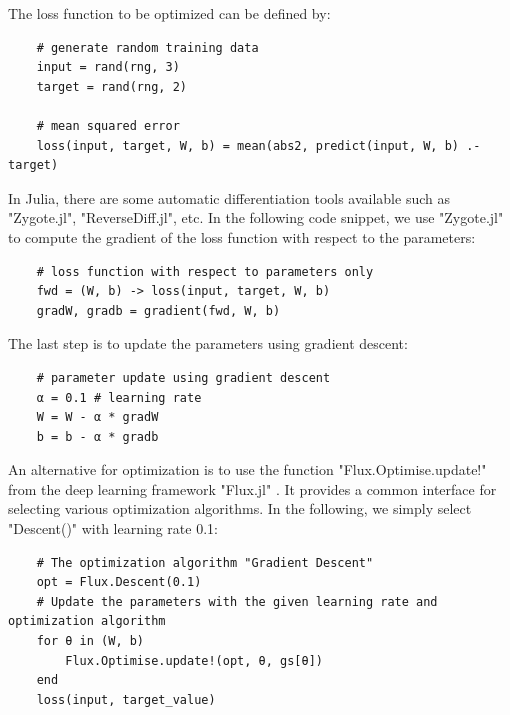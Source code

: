 \documentclass[
	parskip, 			   %
	twoside, 			   %
	DIV=14, 			   %
	BCOR=15.0mm, 		   %
	headsepline, 		   %
	open=right, 		   %
	captions=tableheading, %
	bibliography=totoc,    %
	numbers=noenddot       %
]{scrreprt}
\begin{document}
The loss function to be optimized can be defined by:

\begin{verbatim}
    # generate random training data
    input = rand(rng, 3)
    target = rand(rng, 2)
    
    # mean squared error
    loss(input, target, W, b) = mean(abs2, predict(input, W, b) .- target)
\end{verbatim}

In Julia, there are some automatic differentiation tools available such as "Zygote.jl", "ReverseDiff.jl", etc. In the following code snippet, we use "Zygote.jl" \cite{Zygote.jl-2018} to compute the gradient of the loss function with respect to the parameters:

\begin{verbatim}
    # loss function with respect to parameters only
    fwd = (W, b) -> loss(input, target, W, b)
    gradW, gradb = gradient(fwd, W, b)
\end{verbatim}

The last step is to update the parameters using gradient descent:

\begin{verbatim}
    # parameter update using gradient descent
    α = 0.1 # learning rate
    W = W - α * gradW
    b = b - α * gradb
\end{verbatim}

An alternative for optimization is to use the function "Flux.Optimise.update!" from the deep learning framework "Flux.jl" \cite{Flux.jl-2018} \cite{innes:2018}. It provides a common interface for selecting various optimization algorithms. In the following, we simply select "Descent()" with learning rate 0.1:

\begin{verbatim}
    # The optimization algorithm "Gradient Descent"
    opt = Flux.Descent(0.1)
    # Update the parameters with the given learning rate and optimization algorithm
    for θ in (W, b)
        Flux.Optimise.update!(opt, θ, gs[θ])
    end
    loss(input, target_value)
\end{verbatim}
\end{document}
